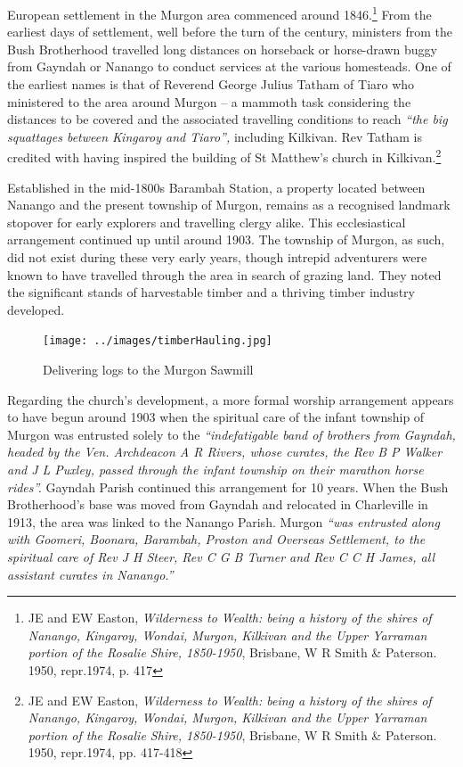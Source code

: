 European settlement in the Murgon area commenced around 1846.\footnote{JE and EW Easton, \emph{Wilderness to Wealth: being a history of the shires of Nanango, Kingaroy, Wondai, Murgon, Kilkivan and the Upper Yarraman portion of the Rosalie Shire, 1850-1950}, Brisbane, W R Smith \& Paterson. 1950, repr.1974, p. 417} From the earliest days of settlement, well before the turn of the century, ministers from the Bush Brotherhood travelled long distances on horseback or horse-drawn buggy from Gayndah or Nanango to conduct services at the various homesteads. One of the earliest names is that of Reverend George Julius Tatham of Tiaro who ministered to the area around Murgon -- a mammoth task considering the distances to be covered and the associated travelling conditions to reach \emph{``the big squattages between Kingaroy and Tiaro'',} including Kilkivan. Rev Tatham is credited with having inspired the building of St Matthew's church in Kilkivan.\footnote{JE and EW Easton, \emph{Wilderness to Wealth: being a history of the shires of Nanango, Kingaroy, Wondai, Murgon, Kilkivan and the Upper Yarraman portion of the Rosalie Shire, 1850-1950}, Brisbane, W R Smith \& Paterson. 1950, repr.1974, pp. 417-418}


Established in the mid-1800s Barambah Station, a property located between Nanango and the present township of Murgon, remains as a recognised landmark stopover for early explorers and travelling clergy alike. This ecclesiastical arrangement continued up until around 1903. The township of Murgon, as such, did not exist during these very early years, though intrepid adventurers were known to have travelled through the area in search of grazing land. They noted the significant stands of harvestable timber and a thriving timber industry developed.









\begin{figure}
\begin{center}
\texttt{[image: ../images/timberHauling.jpg]}
\caption{Delivering logs to the Murgon Sawmill}
\end{center}
\end{figure}




Regarding the church's development, a more formal worship arrangement appears to have begun around 1903 when the spiritual care of the infant township of Murgon was entrusted solely to the \emph{``indefatigable band of brothers from Gayndah, headed by the Ven. Archdeacon A R Rivers, whose curates, the Rev B P Walker and J L Puxley, passed through the infant township on their marathon horse rides''.} Gayndah Parish continued this arrangement for 10 years. When the Bush Brotherhood's base was moved from Gayndah and relocated in Charleville in 1913, the area was linked to the Nanango Parish. Murgon \emph{``was entrusted along with Goomeri, Boonara, Barambah, Proston and Overseas Settlement, to the spiritual care of Rev J H Steer, Rev C G B Turner and Rev C C H James, all assistant curates in Nanango.''}



